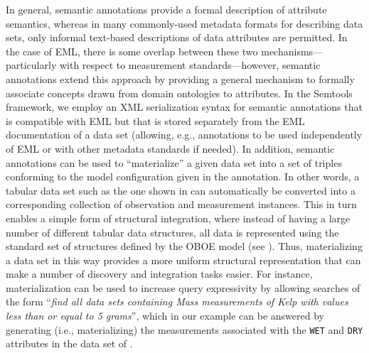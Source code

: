 In general, semantic annotations provide a formal description of
attribute semantics, whereas in many commonly-used metadata formats
for describing data sets, only informal text-based descriptions of
data attributes are permitted.  In the case of EML, there is some
overlap between these two mechanisms---particularly with respect to
measurement standards---however, semantic annotations extend this
approach by providing a general mechanism to formally associate
concepts drawn from domain ontologies to attributes. In the Semtools
framework, we employ an XML serialization syntax for semantic
annotations that is compatible with EML but that is stored separately
from the EML documentation of a data set (allowing, e.g., annotations
to be used independently of EML or with other metadata standards if
needed). In addition, semantic annotations can be used to
``materialize'' a given data set into a set of triples conforming to
the model configuration given in the annotation. In other words, a
tabular data set such as the one shown in 
can automatically be converted into a corresponding collection of
observation and measurement instances. This in turn enables a simple
form of structural integration, where instead of having a large number
of different tabular data structures, all data is represented using
the standard set of structures defined by the OBOE model (see
). Thus, materializing a data set in this way
provides a more uniform structural representation that can make a
number of discovery and integration tasks easier. For instance,
materialization can be used to increase query expressivity by allowing
searches of the form ``\emph{find all data sets containing Mass
  measurements of Kelp with values less than or equal to 5 grams}'', which in
our example can be answered by generating (i.e., materializing) the
measurements associated with the {\tt WET} and {\tt DRY} attributes in the data set
of .





